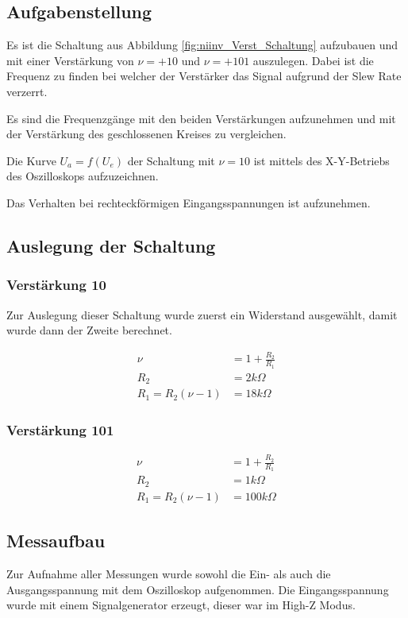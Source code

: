 \subsection{Aufgabenstellung}
Es ist die Schaltung aus Abbildung \ref{fig:niinv_Verst_Schaltung} aufzubauen und mit  einer Verstärkung von $\nu=+10$ und $\nu = +101$ auszulegen. Dabei ist die Frequenz zu finden bei welcher der Verstärker das Signal aufgrund der Slew Rate verzerrt. 

Es sind die Frequenzgänge mit den beiden Verstärkungen aufzunehmen und mit der Verstärkung des geschlossenen Kreises zu vergleichen.

Die Kurve $U_a = f(U_e)$ der Schaltung mit $\nu=10$ ist mittels des X-Y-Betriebs des Oszilloskops aufzuzeichnen.

Das Verhalten bei rechteckförmigen Eingangsspannungen ist aufzunehmen.


\subsection{Auslegung der Schaltung}
\subsubsection{Verstärkung 10}
Zur Auslegung dieser Schaltung wurde zuerst ein Widerstand ausgewählt, damit wurde dann der Zweite berechnet.

\begin{align}
    \nu &= 1+ \frac{R_2}{R_1}\\
    R_2 &= 2k\Omega\\
    R_1 = R_2(\nu - 1) &= 18 k\Omega
\end{align}

\subsubsection{Verstärkung 101}

\begin{align}
    \nu &= 1+ \frac{R_2}{R_1}\\
    R_2 &= 1k\Omega\\
    R_1 = R_2(\nu - 1) &= 100 k\Omega
\end{align}

\subsection{Messaufbau}
Zur Aufnahme aller Messungen wurde sowohl die Ein- als auch die Ausgangsspannung mit dem Oszilloskop aufgenommen. Die Eingangsspannung wurde mit einem Signalgenerator erzeugt, dieser war im High-Z Modus. 


